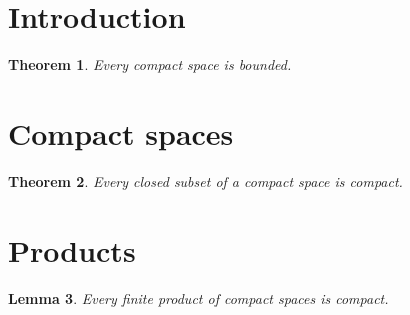 \documentclass{article}
\newtheorem{theorem}{Theorem}[section]
\newtheorem{lemma}[theorem]{Lemma}
\begin{document}
\section{Introduction}
\begin{theorem} Every compact space is bounded. \end{theorem}
\appendix
\section{Compact spaces}
\begin{theorem} Every closed subset of a compact space is compact. \end{theorem}
\section{Products}
\begin{lemma} Every finite product of compact spaces is compact. \end{lemma}
\end{document}
